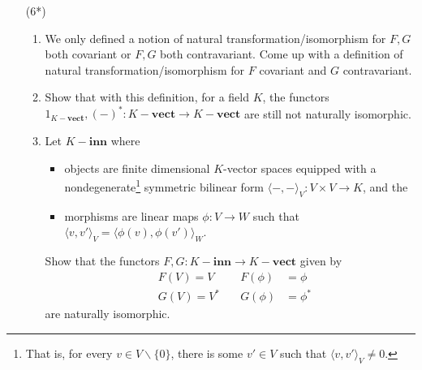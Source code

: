 \documentclass{amsart}[12pt]
\numberwithin{equation}{section}
\theoremstyle{plain} %
\theoremstyle{definition}
\theoremstyle{remark}
\newcommand{\vs}[1]{#1-\mathbf{vect}}
\begin{document}
\begin{enumerate}
\item[(6*)]
\begin{enumerate}
\item We only defined a notion of natural transformation/isomorphism for $F,G$ both covariant or $F,G$ both contravariant. Come up with a definition of natural transformation/isomorphism for $F$ covariant and $G$ contravariant.
\item Show that with this definition, for a field $K$, the functors $1_{\vs{K}},(-)^*:\vs{K}\to \vs{K}$ are still not naturally isomorphic.
\item Let $K-\mathbf{inn}$ where 
\begin{itemize}
\item objects are finite dimensional $K$-vector spaces equipped with a nondegenerate\footnote{That is, for every $v\in V\smallsetminus\{0\}$, there is some $v'\in V$ such that $\langle v, v' \rangle_V\neq 0$.} symmetric bilinear form $\langle - , - \rangle_V: V\times V \to K$, and the 
\item morphisms are linear maps $\phi:V\to W$ such that $\langle v, v' \rangle_V = \langle \phi(v) , \phi(v')\rangle_W$.
\end{itemize}
 Show that the functors $F,G:K-\mathbf{inn}\to \vs{K}$ given by
\[\begin{aligned} &F(V)= V  \quad	&F(\phi)&=\phi \\
&G(V) = V^* 	\quad	 &G(\phi)&= \phi^*\end{aligned}\]
 are naturally isomorphic.
\end{enumerate}
\end{enumerate}
\end{document}
